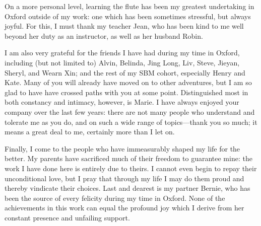On a more personal level, learning the flute has been my greatest undertaking in Oxford outside of my work: one which has been sometimes stressful, but always joyful.
For this, I must thank my teacher Jean, who has been kind to me well beyond her duty as an instructor, as well as her husband Robin.

I am also very grateful for the friends I have had during my time in Oxford, including (but not limited to) Alvin, Belinda, Jing Long, Liv, Steve, Jieyan, Sheryl, and Wearn Xin; and the rest of my SBM cohort, especially Henry and Kate.
Many of you will already have moved on to other adventures, but I am so glad to have have crossed paths with you at some point.
Distinguished most in both constancy and intimacy, however, is Marie.
I have always enjoyed your company over the last few years:
there are not many people who understand and tolerate me as you do, and on such a wide range of topics---thank you so much; it means a great deal to me, certainly more than I let on.

Finally, I come to the people who have immeasurably shaped my life for the better.
My parents have sacrificed much of their freedom to guarantee mine: the work I have done here is entirely due to theirs.
I cannot even begin to repay their unconditional love, but I pray that through my life I may do them proud and thereby vindicate their choices.
Last and dearest is my partner Bernie, who has been the source of every felicity during my time in Oxford.
None of the achievements in this work can equal the profound joy which I derive from her constant presence and unfailing support.
